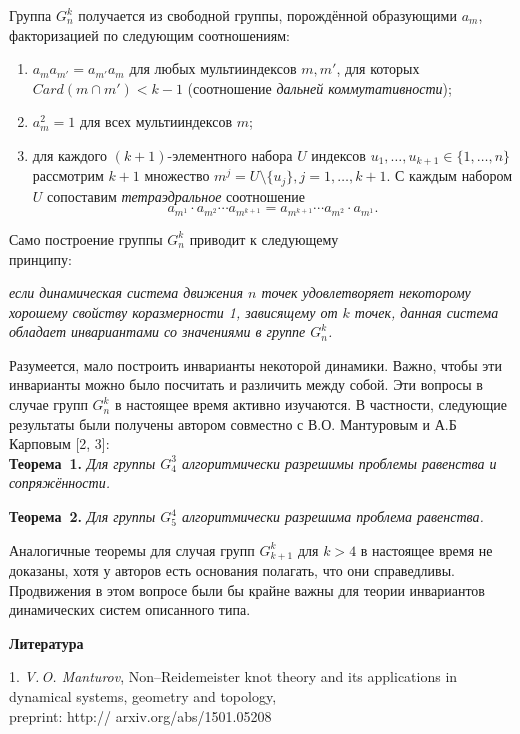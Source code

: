 Группа $G_n^k$ получается из свободной группы, порождённой образующими $a_m$, факторизацией по следующим соотношениям:

\begin{enumerate}
	\item $a_{m}a_{m'}=a_{m'}a_{m}$ для любых мультииндексов $m, m'$, для которых $Card(m\cap m') < k-1$ (соотношение {\em дальней коммутативности});
	\item $a_m^2=1$ для всех мультииндексов $m$;
	\item для каждого $(k+1)$-элементного набора $U$ индексов $u_{1},\dots, u_{k+1} \in \{1,\dots, n\}$ рассмотрим $k+1$ множество $m^{j}=U\setminus \{u_{j}\}, j=1,\dots, k+1$. С каждым набором $U$ сопоставим {\em тетраэдральное} соотношение $$a_{m^1}\cdot a_{m^2}\cdots a_{m^{k+1}}= a_{m^{k+1}}\cdots a_{m^2}\cdot a_{m^1}.$$
\end{enumerate}

Само построение группы $G_n^k$ приводит к следующему
\\принципу:

\begin{center}
	{\em если динамическая система движения $n$ точек удовлетворяет некоторому хорошему свойству коразмерности 1, зависящему от $k$ точек, данная система обладает инвариантами со значениями в группе $G_n^k$.}
\end{center}

Разумеется, мало построить инварианты некоторой динамики. Важно, чтобы эти инварианты можно было посчитать и различить между собой. Эти вопросы в случае групп $G_n^k$ в настоящее время активно изучаются. В частности, следующие результаты были получены автором совместно с В.О. Мантуровым и А.Б Карповым [2, 3]: \\

\textbf{Теорема~1.} {\it Для группы $G_4^3$ алгоритмически разрешимы проблемы равенства и сопряжённости.}

\textbf{Теорема~2.} {\it Для группы $G_5^4$ алгоритмически разрешима проблема равенства.}

Аналогичные теоремы для случая групп $G_{k+1}^k$ для $k>4$ в настоящее время не доказаны, хотя у авторов есть основания полагать, что они справедливы. Продвижения в этом вопросе были бы крайне важны для теории инвариантов динамических систем описанного типа. 


\smallskip \centerline {\bf Литература} \nopagebreak


1. {\it V.\,O. Manturov}, Non--Reidemeister knot theory and its applications in dynamical systems, geometry and topology, \\preprint: http:// arxiv.org/abs/1501.05208

